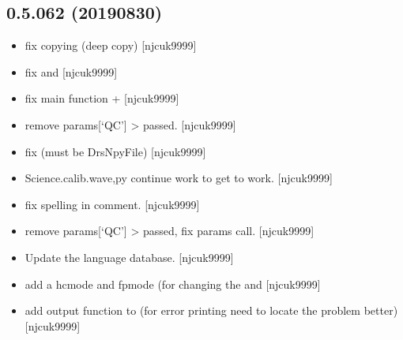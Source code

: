 \documentclass[a4paper,10pt,english]{report}
\begin{document}
\subsection{0.5.062 (2019\sphinxhyphen{}08\sphinxhyphen{}30)}
\label{\detokenize{misc/changelog:id100}}\begin{itemize}
\item {} 
 \sphinxhyphen{} fix copying (deep copy)
{[}njcuk9999{]}

\item {} 
 \sphinxhyphen{} fix  and  {[}njcuk9999{]}

\item {} 
 \sphinxhyphen{} fix main function  +  {[}njcuk9999{]}

\item {} 
 \sphinxhyphen{} remove params{[}‘QC’{]} \textendash{}\textgreater{} passed. {[}njcuk9999{]}

\item {} 
 \sphinxhyphen{} fix  (must be DrsNpyFile)
{[}njcuk9999{]}

\item {} 
Science.calib.wave,py \sphinxhyphen{} continue work to get  to
work. {[}njcuk9999{]}

\item {} 
 \sphinxhyphen{} fix spelling in comment. {[}njcuk9999{]}

\item {} 
 \sphinxhyphen{} remove params{[}‘QC’{]} \textendash{}\textgreater{} passed, fix 
params call. {[}njcuk9999{]}

\item {} 
Update the language database. {[}njcuk9999{]}

\item {} 
 \sphinxhyphen{} add a hcmode and
fpmode (for changing the  and  {[}njcuk9999{]}

\item {} 
 \sphinxhyphen{} add output function to  (for error
printing \sphinxhyphen{} need to locate the problem better) {[}njcuk9999{]}


\end{itemize}
\end{document}
